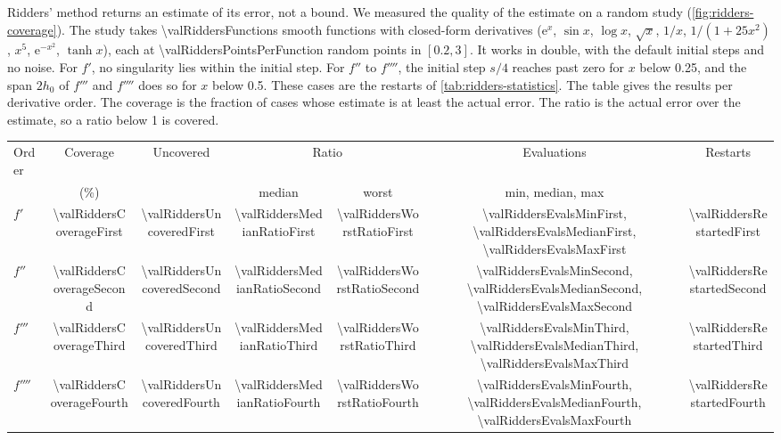Ridders' method returns an estimate of its error, not a bound. We measured the quality of the estimate on a random
study (\cref{fig:ridders-coverage}). The study takes \num{\valRiddersFunctions} smooth functions with closed-form
derivatives ($\mathrm{e}^x$, $\sin x$, $\log x$, $\sqrt{x}$, $1/x$, $1/(1 + 25x^2)$, $x^5$, $\mathrm{e}^{-x^2}$,
$\tanh x$), each at \num{\valRiddersPointsPerFunction} random points in $[0.2, 3]$. It works in double, with the
default initial steps and no noise. For $f'$, no singularity lies within the initial step. For $f''$ to $f''''$, the
initial step $s/4$ reaches past zero for $x$ below 0.25, and the span $2 h_0$ of $f'''$ and $f''''$ does so for $x$
below 0.5. These cases are the restarts of \cref{tab:ridders-statistics}. The table gives the results per derivative
order. The coverage is the fraction of cases whose estimate is at least the actual error. The ratio is the actual
error over the estimate, so a ratio below 1 is covered.

\begin{table}
\centering\footnotesize
\begin{tabular}{@{}lcccccc@{}}
\toprule
Order & Coverage & Uncovered & \multicolumn{2}{c}{Ratio} & Evaluations & Restarts\\
\cmidrule(lr){4-5}
 & (\%) & & median & worst & min, median, max & \\
\midrule
$f'$ & \num{\valRiddersCoverageFirst} & \num{\valRiddersUncoveredFirst} & \num{\valRiddersMedianRatioFirst} &
  \num{\valRiddersWorstRatioFirst} & \num{\valRiddersEvalsMinFirst}, \num{\valRiddersEvalsMedianFirst},
  \num{\valRiddersEvalsMaxFirst} & \num{\valRiddersRestartedFirst}\\
$f''$ & \num{\valRiddersCoverageSecond} & \num{\valRiddersUncoveredSecond} & \num{\valRiddersMedianRatioSecond} &
  \num{\valRiddersWorstRatioSecond} & \num{\valRiddersEvalsMinSecond}, \num{\valRiddersEvalsMedianSecond},
  \num{\valRiddersEvalsMaxSecond} & \num{\valRiddersRestartedSecond}\\
$f'''$ & \num{\valRiddersCoverageThird} & \num{\valRiddersUncoveredThird} & \num{\valRiddersMedianRatioThird} &
  \num{\valRiddersWorstRatioThird} & \num{\valRiddersEvalsMinThird}, \num{\valRiddersEvalsMedianThird},
  \num{\valRiddersEvalsMaxThird} & \num{\valRiddersRestartedThird}\\
$f''''$ & \num{\valRiddersCoverageFourth} & \num{\valRiddersUncoveredFourth} & \num{\valRiddersMedianRatioFourth} &
  \num{\valRiddersWorstRatioFourth} & \num{\valRiddersEvalsMinFourth}, \num{\valRiddersEvalsMedianFourth},
  \num{\valRiddersEvalsMaxFourth} & \num{\valRiddersRestartedFourth}\\
\bottomrule
\end{tabular}
\end{table}

